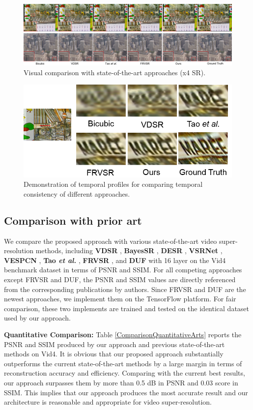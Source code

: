 \documentclass[letterpaper]{article} %
\begin{document}
\begin{figure}[t]
\centering
\includegraphics[width=8.5 cm]{Fig7.png}
\caption{Visual comparison with state-of-the-art approaches (x4 SR).}
\label{ComparisonVisualArts}
\end{figure}




\begin{figure}[t]
\centering
\includegraphics[width=8 cm]{Fig8.png}
\caption{Demonstration of temporal profiles for comparing temporal consistency of different approaches.}
\label{TemporalConsistency}
\end{figure}


\subsection{Comparison with prior art}


We compare the proposed approach with various state-of-the-art video super-resolution methods, including  \textbf{VDSR} \cite{VDSR2016cvpr}, \textbf{BayesSR} \cite{BayesSR2011cvpr}, \textbf{DESR} \cite{DESR2015iccv}, \textbf{VSRNet} \cite{VSRNet2016TCT}, \textbf{VESPCN} \cite{VESPCN2017cvpr}, \textbf{Tao \textit{et al.}} \cite{Tao2017iccv}, \textbf{FRVSR} \cite{FRVSR2018cvpr}, and \textbf{DUF} with 16 layer \cite{DUF16L2018cvpr} on the Vid4 benchmark dataset in terms of PSNR and SSIM. For all competing approaches except FRVSR and DUF, the PSNR and SSIM values are directly referenced from the corresponding publications by authors. Since FRVSR and DUF are the newest approaches, we implement them on the TensorFlow platform. For fair comparison, these two implements are trained and tested on the identical dataset used by our approach.


\textbf{Quantitative Comparison:} Table \ref{ComparisonQuantitativeArts} reports the PSNR and SSIM produced by our approach and previous state-of-the-art methods on Vid4. It is obvious that our proposed approach substantially outperforms the current state-of-the-art methods by a large margin in terms of reconstruction accuracy and efficiency. Comparing with the current best results, our approach surpasses them by more than 0.5 dB in PSNR and 0.03 score in SSIM. This implies that our approach produces the most accurate result and our architecture is reasonable and appropriate for video super-resolution.
\end{document}

